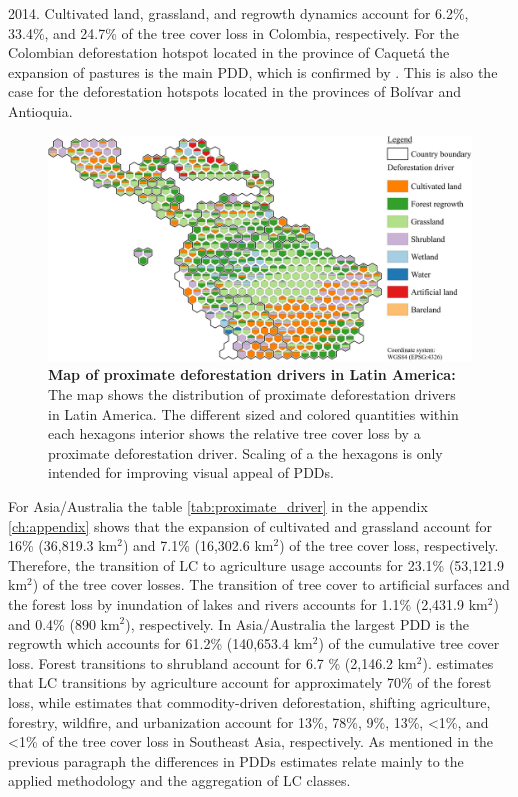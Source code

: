 2014. Cultivated land, grassland, and regrowth dynamics account for 6.2\%, 33.4\%, and 24.7\% of the tree cover loss in Colombia, respectively. For the Colombian deforestation hotspot located in the province of Caquetá the expansion of pastures is the main \ac{PDD}, which is confirmed by \citet{Graesser2015}. This is also the case for the deforestation hotspots located in the provinces of Bolívar and Antioquia.
			\begin{figure}[ht]
				\centering
				\includegraphics[scale=1]{img/americas_driver_frameless}
				\caption[Map of proximate deforestation drivers in Latin America]{\textbf{Map of proximate deforestation drivers in Latin America:} The map shows the distribution of proximate deforestation drivers in Latin America. The different sized and colored quantities within each hexagons interior shows the relative tree cover loss by a proximate deforestation driver. Scaling of a the hexagons is only intended for improving visual appeal of \acp{PDD}.}
				\label{fig:americas_driver}
			\end{figure}

			For Asia/Australia the table \ref{tab:proximate_driver} in the appendix \ref{ch:appendix} shows that the expansion of cultivated and grassland account for 16\% (36,819.3 km$^2$) and 7.1\% (16,302.6 km$^2$) of the tree cover loss, respectively. Therefore, the transition of \ac{LC} to agriculture usage accounts for 23.1\% (53,121.9 km$^2$) of the tree cover losses. The transition of tree cover to artificial surfaces and the forest loss by inundation of lakes and rivers accounts for 1.1\% (2,431.9 km$^2$) and 0.4\% (890 km$^2$), respectively. In Asia/Australia the largest \ac{PDD} is the regrowth which accounts for 61.2\% (140,653.4 km$^2$) of the cumulative tree cover loss. Forest transitions to shrubland account for 6.7 \% (2,146.2 km$^2$). \citet{Hosonuma2012} estimates that \ac{LC} transitions by agriculture account for approximately 70\% of the forest loss, while \citet{Curtis2018} estimates that commodity-driven deforestation, shifting agriculture, forestry, wildfire, and urbanization account for 13\%, 78\%, 9\%, 13\%, <1\%, and <1\% of the tree cover loss in Southeast Asia, respectively. As mentioned in the previous paragraph the differences in \acp{PDD} estimates relate mainly to the applied methodology and the aggregation of \ac{LC} classes. 

